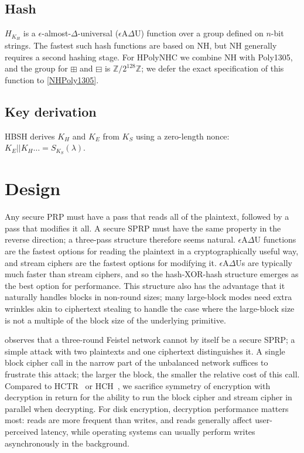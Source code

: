 \documentclass[journal=tosc,preprint,floatrow,submission]{iacrtrans}
\begin{document}
\subsection{Hash}
$H_{K_H}$ is a $\epsilon$-almost-$\Delta$-universal ($\epsilon$A$\Delta$U) function over a group
defined on $n$-bit strings. The fastest such hash functions are based on NH, but NH generally
requires a second hashing stage. For HPolyNHC we combine NH with Poly1305, and the group for
$\boxplus$ and $\boxminus$ is $\mathbb{Z}/2^{128}\mathbb{Z}$; we defer the exact specification
of this function to \autoref{NHPoly1305}.

\subsection{Key derivation}\label{keyderivation}
HBSH derives $K_H$ and $K_E$ from $K_S$ using a zero-length nonce:
$K_E || K_H \ldots = S_{K_S}(\lambda)$.

\section{Design}
Any secure PRP must have a pass that reads all of the plaintext, followed by a pass that modifies
it all. A secure SPRP must have the same property in the reverse direction;
a three-pass structure therefore seems natural.
$\epsilon$A$\Delta$U functions are the fastest options for reading the plaintext in a
cryptographically useful way, and stream ciphers are the fastest options for modifying it.
$\epsilon$A$\Delta$Us
are typically much faster than stream ciphers, and so the hash-XOR-hash structure emerges as
the best option for performance. This structure also has the advantage that it naturally handles
blocks in non-round sizes; many large-block modes need extra wrinkles akin to ciphertext stealing
to handle the case where the large-block size is not
a multiple of the block size of the underlying primitive.

\cite{luby-rackoff} observes that a three-round Feistel network cannot by itself be a secure SPRP;
a simple attack with two plaintexts and one ciphertext distinguishes it. A single block cipher call
in the narrow part of the unbalanced network suffices to frustrate this attack; the
larger the block, the smaller the relative cost of this call.
Compared to HCTR~\cite{hctr} or HCH~\cite{hch}, we sacrifice
symmetry of encryption with decryption in return for
the ability to run the block cipher and stream cipher in parallel when decrypting.
For disk encryption, decryption performance matters most:
reads are more frequent than writes, and reads generally affect user-perceived latency, while
operating systems can usually perform writes asynchronously in the background.
\end{document}
